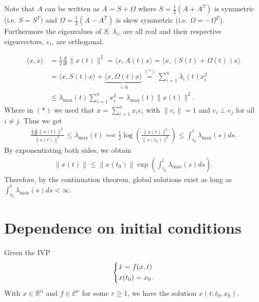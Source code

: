 \begin{remark}[]
	Note that ${A} $ can be written as ${A}={S} +{\Omega }$ where ${S} = \frac{1}{2}({A} + {A}^T)$ is symmetric (i.e. ${S} = {S}^T)$ and ${\Omega} = \frac{1}{2}({A} - {A}^T)$ is skew symmetric (i.e. ${\Omega} = -{\Omega}^T$). Furthermore the eigenvalues of ${S}$, $\lambda_i$, are all real and their respective eigenvectors, $e_i$, are orthogonal.
\end{remark}

\begin{ex}
	\begin{subequations}\begin{align}
	\langle  {x}, \dot{ {x}} \rangle &= \frac{1}{2} \frac{d}{dt}  \| {x}(t) \|^2 = \langle  {x}, {A}(t)  {x}\rangle = \langle  {x}, ({S}(t) + {\Omega}(t) )  {x} \rangle \\
				   &= \langle  {x}, S(t)  {x} \rangle + \underbrace{\langle  {x}, {\Omega}(t)  {x} \rangle}_{=0} \stackrel{(*)}{=} 
				   \sum_{i=1}^{n} \lambda_i(t) x_i^2 \\
				   &\leq \lambda_{ \textrm{max} }(t) \sum_{i=1}^{n} x_i^2 = \lambda _{ \textrm{max} }(t)  \|  {x}(t) \|^2.
\end{align}\end{subequations}
Where in $(*)$ we used that $ {x} = \sum_{i=1}^{n} x_i  {e}_i $ with $ \| {e}_i \|=1$ and $ {e}_i \perp  {e}_j$ for all $i \neq j$. Thus we get
\begin{align}
	\frac{\frac{1}{2}\frac{d}{dt} \| {x}(t) \|^2}{ \| {x}(t) \|^2} \leq \lambda_{ \textrm{max} }(t) 
	\implies \frac{1}{2}\log \left( \frac{ \| {x}(t) \|^2}{ \| {x}(t_0) \|^2} \right)  \leq \int_{t_0}^{t}  \lambda _{ \textrm{max} }(s) ds.
\end{align}
By exponentiating both sides, we obtain
\begin{align}
\label{eq:upper_bound_on_linear_sol}
\boxed{  \| {x}(t) \| \leq  \| {x}(t_0)  \| \exp\left(\int_{t_0}^{t} \lambda_{ \textrm{max} }(s)ds\right).}
\end{align}
Therefore, by the continuation theorem, global solutions exist as long as $\int_{t_0}^{t} \lambda_{ \textrm{max} }(s) ds < \infty $.
\end{ex}

\section{Dependence on initial conditions}
Given the IVP
\begin{align}
	\begin{dcases}
	\dot{ {x}} = f( {x},t) \\  {x}(t_0) =  {x}_0.
	\end{dcases}
\end{align}
With $ {x} \in \mathbb{R}^{n}$ and $f\in \mathcal{C}^r$ for some $r\geq 1$, we have the solution $ {x}(t; t_0,  {x}_0)$.

